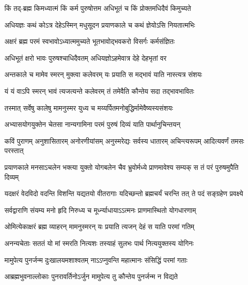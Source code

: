 \twolineshloka
{किं तद्-ब्रह्म किमध्यात्मं किं कर्म पुरुषोत्तम}
{अधिभूतं च किं प्रोक्तमधिदैवं किमुच्यते}%

\twolineshloka
{अधियज्ञः कथं कोऽत्र देहेऽस्मिन् मधुसूदन}
{प्रयाणकाले च कथं ज्ञेयोऽसि नियतात्मभिः}%

\twolineshloka
{अक्षरं ब्रह्म परमं स्वभावोऽध्यात्ममुच्यते}
{भूतभावोद्भवकरो विसर्गः कर्मसंज्ञितः}%

\twolineshloka
{अधिभूतं क्षरो भावः पुरुषश्चाधिदैवतम्}
{अधियज्ञोऽहमेवात्र देहे देहभृतां वर}%

\twolineshloka
{अन्तकाले च मामेव स्मरन् मुक्त्वा कलेवरम्}
{यः प्रयाति स मद्भावं याति नास्त्यत्र संशयः}%

\twolineshloka
{यं यं वाऽपि स्मरन् भावं त्यजत्यन्ते कलेवरम्}
{तं तमेवैति कौन्तेय सदा तद्भावभावितः}%

\twolineshloka
{तस्मात् सर्वेषु कालेषु मामनुस्मर युध्य च}
{मय्यर्पितमनोबुद्धिर्मामेवैष्यस्यसंशयः}%

\twolineshloka
{अभ्यासयोगयुक्तेन चेतसा नान्यगामिना}
{परमं पुरुषं दिव्यं याति पार्थानुचिन्तयन्}%

\fourlineindentedshloka
{कविं पुराणम् अनुशासितारम्}
{अनोरणीयांसम् अनुस्मरेद्यः}
{सर्वस्य धातारम् अचिन्त्यरूपम्}
{आदित्यवर्णं तमसः परस्तात्}%

\fourlineindentedshloka
{प्रयाणकाले मनसाऽचलेन}
{भक्त्या युक्तो योगबलेन चैव}
{भ्रुवोर्मध्ये प्राणमावेश्य सम्यक्}
{स तं परं पुरुषमुपैति दिव्यम्}%

\fourlineindentedshloka
{यदक्षरं वेदविदो वदन्ति}
{विशन्ति यद्यतयो वीतरागाः}
{यदिच्छन्तो ब्रह्मचर्यं चरन्ति}
{तत् ते पदं सङ्ग्रहेण प्रवक्ष्ये}%

\twolineshloka
{सर्वद्वाराणि संयम्य मनो हृदि निरुध्य च}
{मूर्ध्न्याधायाऽऽत्मनः प्राणमास्थितो योगधारणाम्}%

\twolineshloka
{ओमित्येकाक्षरं ब्रह्म व्याहरन् मामनुस्मरन्}
{यः प्रयाति त्यजन् देहं स याति परमां गतिम्}%

\twolineshloka
{अनन्यचेताः सततं यो मां स्मरति नित्यशः}
{तस्याहं सुलभः पार्थ नित्ययुक्तस्य योगिनः}%

\twolineshloka
{मामुपेत्य पुनर्जन्म दुःखालयमशाश्वतम्}
{नाऽऽप्नुवन्ति महात्मानः संसिद्धिं परमां गताः}%

\twolineshloka
{आब्रह्मभुवनाल्लोकाः पुनरावर्तिनोऽर्जुन}
{मामुपेत्य तु कौन्तेय पुनर्जन्म न विद्यते}%

